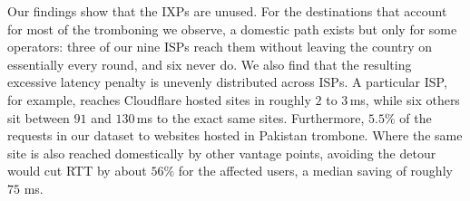 \documentclass[sigconf,anonymous,10pt]{acmart}
\begin{document}






Our findings show that the IXPs are unused. For the destinations that account for most of the tromboning we observe, a domestic path exists but only for some operators: three of our nine ISPs reach them without leaving the country on essentially every round, and six never do. We also find that the resulting excessive latency penalty is unevenly distributed across ISPs. A particular ISP, for example, reaches Cloudflare hosted sites in roughly $2$ to $3$\,ms, while six others sit between $91$ and $130$\,ms to the exact same sites. Furthermore, $5.5\%$ of the requests in our dataset to websites hosted in Pakistan trombone. Where the same site is also reached domestically by other vantage points, avoiding the detour would cut RTT by about $56\%$ for the affected users, a median saving of roughly $75$ ms.
\end{document}
